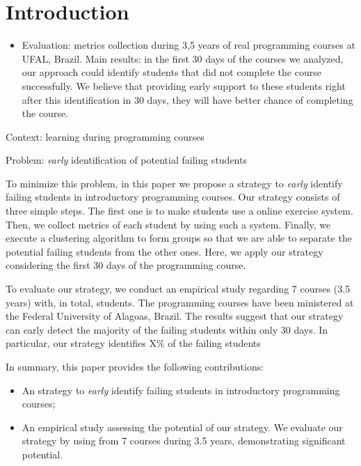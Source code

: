 \section{Introduction}

\begin{itemize}
	
	\item Evaluation: metrics collection during 3,5 years of real programming courses at UFAL, Brazil. Main results: in the first 30 days of the courses we analyzed, our approach could identify students that did not complete the course successfully. We believe that providing early support to these students right after this identification in 30 days, they will have better chance of completing the course.

\end{itemize}

Context: learning during programming courses \todots

Problem: \textit{early} identification of potential failing students \todots

To minimize this problem, in this paper we propose a strategy to \textit{early} identify failing students in introductory programming courses. Our strategy consists of three simple steps. The first one is to make students use a online exercise system. Then, we collect metrics of each student by using such a system. Finally, we execute a clustering algorithm to form groups so that we are able to separate the potential failing students from the other ones. Here, we apply our strategy considering the first 30 days of the programming course.

To evaluate our strategy, we conduct an empirical study regarding 7 courses (3.5 years) with, in total, \totalStudents students. The programming courses have been ministered at the Federal University of Alagoas, Brazil. The results suggest that our strategy can early detect the majority of the failing students within only 30 days. In particular, our strategy identifies X\% of the failing students 

In summary, this paper provides the following contributions:

\begin{itemize}

	\item An strategy to \textit{early} identify failing students in introductory programming courses;
	
	\item An empirical study assessing the potential of our strategy. We evaluate our strategy by using \totalStudents from 7 courses during 3.5 years, demonstrating significant potential.

\end{itemize}